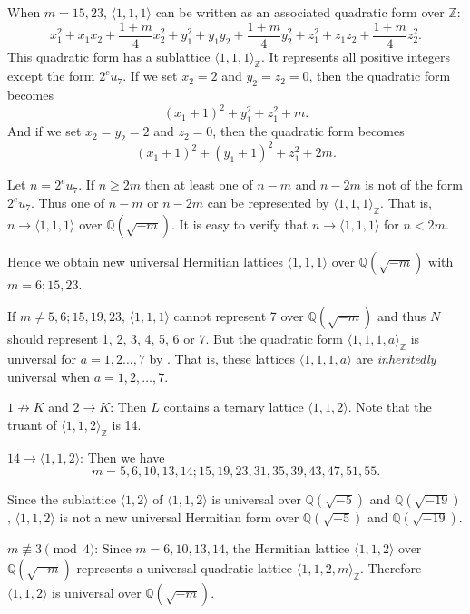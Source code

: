 \documentclass[a4paper,10pt,reqno]{amsart}
\begin{document}
{} When $m=15,23$, ${\langle {1,1,1} \rangle}$ can be written as an associated quadratic form over
${\mathbb{Z}}$:
\[
    x_1^2+x_1x_2+\frac{1+m}4x_2^2 + y_1^2+y_1y_2+\frac{1+m}4y_2^2 +
    z_1^2+z_1z_2+\frac{1+m}4z_2^2.
\]
This quadratic form has a sublattice ${\langle {1,1,1} \rangle}_{\mathbb{Z}}$. It represents all positive integers except
the form $2^{e} u_7$. If we set $x_2=2$ and $y_2 = z_2=0$, then the quadratic form becomes
\[
    (x_1+1)^2 + y_1^2 + z_1^2 + m.
\]
And if we set $x_2=y_2=2$ and $z_2=0$, then the quadratic form becomes
\[
    (x_1+1)^2 + (y_1+1)^2 + z_1^2 + 2m.
\]

Let $n=2^{e} u_7$. If $n \ge 2m$ then at least one of $n-m$ and $n-2m$ is not of the form $2^{e}
u_7$. Thus one of $n-m$ or $n-2m$ can be represented by ${\langle {1,1,1} \rangle}_{\mathbb{Z}}$. That is, $n \to
{\langle {1,1,1} \rangle}$ over ${\mathbb{Q}(\sqrt{{-m}})}$. It is easy to verify that $n \rightarrow {\langle {1,1,1} \rangle}$ for $n < 2m$.

Hence we obtain new universal Hermitian lattices ${\langle {1,1,1} \rangle}$ over ${\mathbb{Q}(\sqrt{{-m}})}$ with $m = 6;15,23$.

If $m \ne 5,6;15,19,23$, ${\langle {1,1,1} \rangle}$ cannot represent 7 over ${\mathbb{Q}(\sqrt{{-m}})}$ and thus $N$ should
represent 1, 2, 3, 4, 5, 6 or 7. But the quadratic form ${\langle {1,1,1,a} \rangle}_{\mathbb{Z}}$ is universal for $a = 1,
2 \dotsc, 7$ by \cite{sR_17}. That is, these lattices ${\langle {1,1,1,a} \rangle}$ are \emph{inheritedly}
universal when $a=1, 2, \dotsc, 7$.

{} $1 \not\to K$ and $2 \to K$: Then $L$ contains a ternary lattice ${\langle {1,1,2} \rangle}$. Note
that the truant of ${\langle {1,1,2} \rangle}_{\mathbb{Z}}$ is 14.

{} $14 \to {\langle {1,1,2} \rangle}$: Then we have
\[
    m =  5, 6, 10, 13, 14; 15, 19, 23, 31, 35, 39, 43, 47, 51, 55.
\]

Since the sublattice ${\langle {1,2} \rangle}$ of ${\langle {1,1,2} \rangle}$ is universal over ${\mathbb{Q}(\sqrt{{-5}})}$ and ${\mathbb{Q}(\sqrt{{-19}})}$,
${\langle {1,1,2} \rangle}$ is not a new universal Hermitian form over ${\mathbb{Q}(\sqrt{{-5}})}$ and ${\mathbb{Q}(\sqrt{{-19}})}$.

{} $m {\not\equiv} 3 \pmod{4}$: Since $m=6, 10, 13, 14$, the Hermitian lattice
${\langle {1,1,2} \rangle}$ over ${\mathbb{Q}(\sqrt{{-m}})}$ represents a universal quadratic lattice ${\langle {1,1,2,m} \rangle}_{\mathbb{Z}}$. Therefore
${\langle {1,1,2} \rangle}$ is universal over ${\mathbb{Q}(\sqrt{{-m}})}$.
\end{document}
